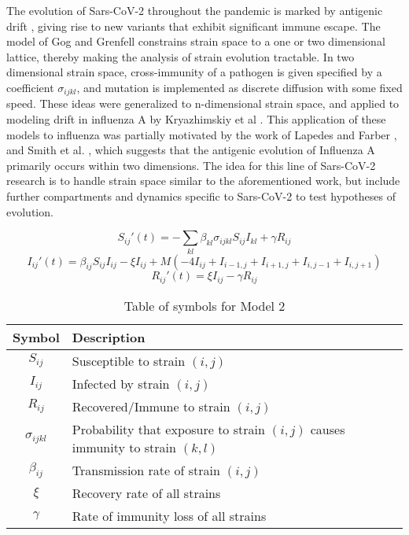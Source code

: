 \documentclass{article}
\begin{document}
The evolution of Sars-CoV-2 throughout the pandemic is marked by antigenic drift \cite{yewdellAntigenicDriftUnderstanding2021}, giving rise to new variants that exhibit significant immune escape. The model of Gog and Grenfell \cite{gogDynamicsSelectionManystrain2002} constrains strain space to a one or two dimensional lattice, thereby making the analysis of strain evolution tractable. In two dimensional strain space, cross-immunity of a pathogen is given specified by a coefficient $\sigma_{ijkl}$, and mutation is implemented as discrete diffusion with some fixed speed. These ideas were generalized to n-dimensional strain space, and applied to modeling drift in influenza A by Kryazhimskiy et al \cite{kryazhimskiyStateSpaceReductionMultiStrain2007}. This application of these models to influenza was partially motivated by the work of Lapedes and Farber \cite{lapedesGeometryShapeSpace2001}, and Smith et al. \cite{smithMappingAntigenicGenetic2004}, which suggests that the antigenic evolution of Influenza A primarily occurs within two dimensions.
The idea for this line of Sars-CoV-2 research is to handle strain space similar to the aforementioned work, but include further compartments and dynamics specific to Sars-CoV-2 to test hypotheses of evolution. 


\begin{equation}
    S_{ij}'(t) = -\sum_{kl} \beta_{kl} \sigma_{ijkl} S_{ij} I_{kl} + \gamma R_{ij}  \label{Seqn}
\end{equation}
\begin{equation}
    I_{ij}'(t) = \beta_{ij} S_{ij} I_{ij} - \xi I_{ij} + M \left(- 4I_{ij} + I_{i-1,j}  + I_{i+1,j} + I_{i,j-1} + I_{i,j+1} \right) \label{Ieqn}    
\end{equation}
\begin{equation}
    R_{ij}'(t) = \xi I_{ij} - \gamma R_{ij}  \label{Reqn}
\end{equation}


\begin{table}[h!]
    \begin{center}
    \begin{tabular}{c|l}
            Symbol & Description \\
            \hline
            \hline
            $S_{ij}$ & Susceptible to strain $(i,j)$ \\
            $I_{ij}$ & Infected by strain $(i,j)$\\
            $R_{ij}$ & Recovered/Immune to strain $(i,j)$\\
            $\sigma_{ijkl}$ & Probability that exposure to strain $(i,j)$ causes immunity to strain $(k,l)$ \\
            $\beta_{ij}$ & Transmission rate of strain $(i,j)$ \\
            $\xi$ & Recovery rate of all strains \\
            $\gamma$ & Rate of immunity loss of all strains \\
    \end{tabular}
    \caption{Table of symbols for Model 2}

    \label{variables_2}
    \end{center}
\end{table}
\end{document}
